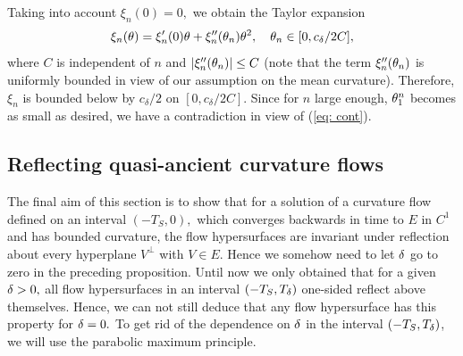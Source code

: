 \documentclass{amsart}
\begin{document}
{Taking into account $\xi_{n}(0)=0,$ we obtain the Taylor expansion
$$\xi_{n}(\theta)=\xi_{n}'(0)\theta+\xi_{n}''(\theta_{n})\theta^{2},\quad \theta_{n}\in[0,c_{\delta}/2C],$$
where $C$ is independent of $n$ and $|\xi''_{n}(\theta_{n})|\leq C$ (note that the term $\xi''_{n}(\theta_{n})$ is uniformly bounded in view of our assumption on the mean curvature). Therefore, $\xi_n$ is bounded below by $c_{\delta}/2$ on $[0,c_{\delta}/2C]$. Since for $n$ large enough, $\theta_{1}^{n}$ becomes as small as desired, we have a contradiction in view of (\ref{eq: cont}).
}
\subsection{Reflecting quasi-ancient curvature flows}
The final aim of this section is to show that for a solution of a curvature flow defined on an interval $(-T_{S},0),$ which converges backwards in time to $E$ in $C^{1}$ and has bounded curvature, the flow hypersurfaces are invariant under reflection about every hyperplane $V^{\perp}$ with $V\in E.$ Hence we somehow need to let $\delta$ go to zero in the preceding proposition. Until now we only obtained that for a given $\delta>0,$ all flow hypersurfaces in an interval $(-T_{S},T_{\delta})$ one-sided reflect above themselves. Hence, we can not still deduce that any flow hypersurface has this property for $\delta=0.$ To get rid of the dependence on $\delta$ in the interval $(-T_{S},T_{\delta})$, we will use the parabolic maximum principle.
\end{document}
